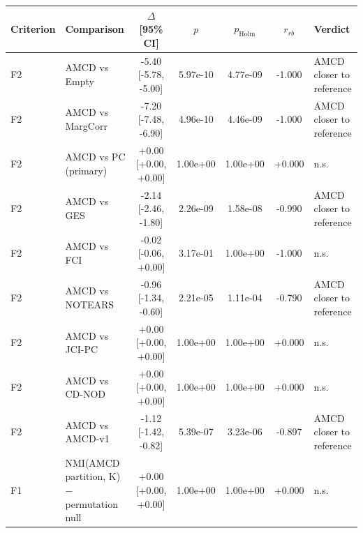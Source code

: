 \begin{tabular}{llccccl}
\toprule
Criterion & Comparison & $\Delta$ [95\% CI] & $p$ & $p_{\mathrm{Holm}}$ & $r_{rb}$ & Verdict \\
\midrule
F2 & AMCD vs Empty & -5.40 [-5.78, -5.00] & 5.97e-10 & 4.77e-09 & -1.000 & AMCD closer to reference \\
F2 & AMCD vs MargCorr & -7.20 [-7.48, -6.90] & 4.96e-10 & 4.46e-09 & -1.000 & AMCD closer to reference \\
F2 & AMCD vs PC (primary) & +0.00 [+0.00, +0.00] & 1.00e+00 & 1.00e+00 & +0.000 & n.s. \\
F2 & AMCD vs GES & -2.14 [-2.46, -1.80] & 2.26e-09 & 1.58e-08 & -0.990 & AMCD closer to reference \\
F2 & AMCD vs FCI & -0.02 [-0.06, +0.00] & 3.17e-01 & 1.00e+00 & -1.000 & n.s. \\
F2 & AMCD vs NOTEARS & -0.96 [-1.34, -0.60] & 2.21e-05 & 1.11e-04 & -0.790 & AMCD closer to reference \\
F2 & AMCD vs JCI-PC & +0.00 [+0.00, +0.00] & 1.00e+00 & 1.00e+00 & +0.000 & n.s. \\
F2 & AMCD vs CD-NOD & +0.00 [+0.00, +0.00] & 1.00e+00 & 1.00e+00 & +0.000 & n.s. \\
F2 & AMCD vs AMCD-v1 & -1.12 [-1.42, -0.82] & 5.39e-07 & 3.23e-06 & -0.897 & AMCD closer to reference \\
F1 & NMI(AMCD partition, K) − permutation null & +0.00 [+0.00, +0.00] & 1.00e+00 & 1.00e+00 & +0.000 & n.s. \\
\bottomrule
\end{tabular}
